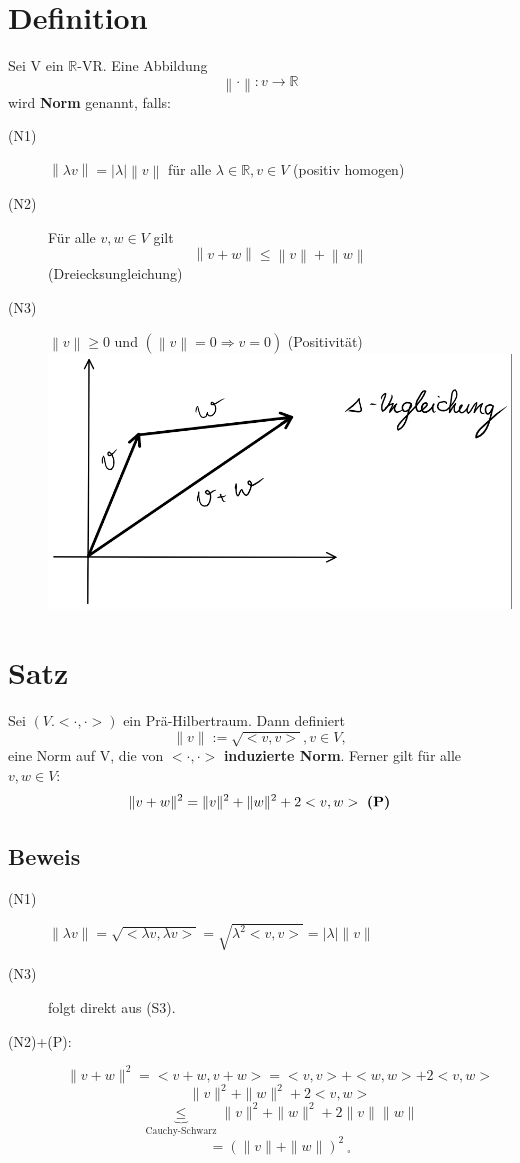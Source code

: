 \documentclass{scrbook}
\begin{document}
\section{Definition}
Sei V ein $\mathbb{R}$-VR. Eine Abbildung
\[\left\| \cdot \right\| : v \to \mathbb{R}\] wird \textbf{Norm} genannt, falls:
\begin{description}
\item[(N1)] $\left\| \lambda v\right\| = \left| \lambda \right| \left\| v\right\|$ für alle $\lambda \in \mathbb{R}, v \in V$ (positiv homogen)
\item[(N2)] Für alle $v,w \in V$ gilt
\[\left\| v+w \right\| \leq \left\| v\right\| + \left\| w\right\|\] (Dreiecksungleichung)
\item[(N3)] $\left\| v \right\| \geq 0$ und $(\left\| v\right\| = 0 \Rightarrow v= 0)$ (Positivität)
\\\includegraphics{Graph4.png}
\\
\end{description}
\section{Satz}
Sei $(V.<\cdot,\cdot>)$ ein Prä-Hilbertraum. Dann definiert
\[\| v \| := \sqrt{<v,v>} , v\in V,\]
eine Norm auf V, die von $<\cdot ,\cdot>$ \textbf{induzierte Norm}.
Ferner gilt für alle $v,w \in V$:
\[\| v+w \|^2 = \|v\|^2 + \|w\|^2 + 2<v,w>\text{ \textbf{(P)}}\]
\subsection*{Beweis}
\begin{description}
\item[(N1)] $\|\lambda v\| = \sqrt{<\lambda v, \lambda v>} = \sqrt{\lambda^2 <v,v>} = |\lambda|\|v\|$
\item[(N3)] folgt direkt aus (S3).
\item[(N2)+(P):]
\[\| v+w \|^2 = <v+w,v+w> = <v,v> + <w,w> + 2<v,w>\]
\[\|v\|^2 +\|w\|^2 + 2<v,w>\]
\[\underbrace{\leq}_{\text{Cauchy-Schwarz}} \|v\|^2 + \|w\|^2 + 2\|v\| \|w\|\]
\[=\left(\|v\|+\|w\|\right)^2\ _\square\]
\end{description}
\end{document}
